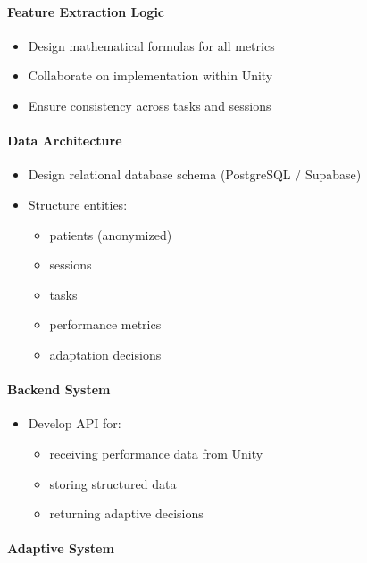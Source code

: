 \documentclass[11pt]{article}
\begin{document}
\paragraph*{Feature Extraction Logic}

\begin{itemize}
\item Design mathematical formulas for all metrics
\item Collaborate on implementation within Unity
\item Ensure consistency across tasks and sessions
\end{itemize}

\paragraph*{Data Architecture}

\begin{itemize}
\item Design relational database schema (PostgreSQL / Supabase)
\item Structure entities:
\begin{itemize}
\item patients (anonymized)
\item sessions
\item tasks
\item performance metrics
\item adaptation decisions
\end{itemize}
\end{itemize}

\paragraph*{Backend System}

\begin{itemize}
\item Develop API for:
\begin{itemize}
\item receiving performance data from Unity
\item storing structured data
\item returning adaptive decisions
\end{itemize}
\end{itemize}

\paragraph*{Adaptive System}
\end{document}

